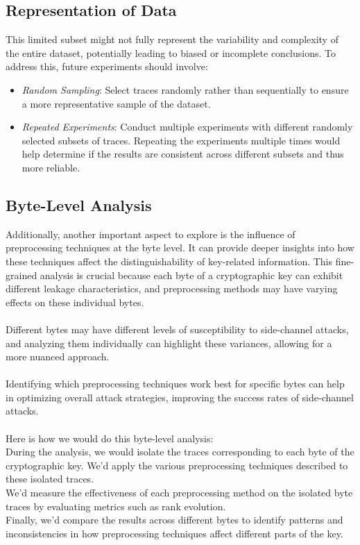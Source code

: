 \documentclass[a4paper,10pt]{article}
\begin{document}
\subsection{Representation of Data}
This limited subset might not fully represent the variability and complexity of the entire dataset, potentially leading to biased or incomplete conclusions.
To address this, future experiments should involve:
\begin{itemize}
    \item \textit{Random Sampling}: Select traces randomly rather than sequentially to ensure a more representative sample of the dataset.
    
    \item \textit{Repeated Experiments}: Conduct multiple experiments with different randomly selected subsets of traces. Repeating the experiments multiple times would help determine if the results are consistent across different subsets and thus more reliable.
\end{itemize}

\subsection{Byte-Level Analysis}
Additionally, another important aspect to explore is the influence of preprocessing techniques at the byte level. 
It can provide deeper insights into how these techniques affect the distinguishability of key-related information. This fine-grained analysis is crucial because each byte of a cryptographic key can exhibit different leakage characteristics, and preprocessing methods may have varying effects on these individual bytes.
\\ \\
Different bytes may have different levels of susceptibility to side-channel attacks, and analyzing them individually can highlight these variances, allowing for a more nuanced approach.
\\ \\
Identifying which preprocessing techniques work best for specific bytes can help in optimizing overall attack strategies, improving the success rates of side-channel attacks.
\\ \\
Here is how we would do this byte-level analysis:\\
During the analysis, we would isolate the traces corresponding to each byte of the cryptographic key. We'd apply the various preprocessing techniques described to these isolated traces.\\
We'd measure the effectiveness of each preprocessing method on the isolated byte traces by evaluating metrics such as rank evolution.\\
Finally, we'd compare the results across different bytes to identify patterns and inconsistencies in how preprocessing techniques affect different parts of the key.
\end{document}
